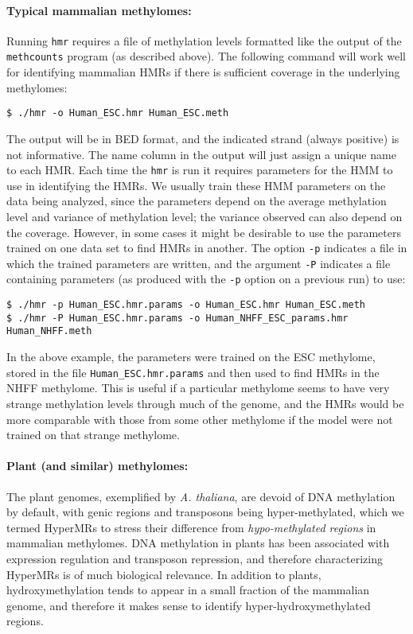 \documentclass[10pt]{article}
\newcommand{\prog}[1]{\texttt{#1}}
\newcommand{\fn}[1]{\texttt{#1}}
\newcommand{\op}[1]{\texttt{#1}}
\begin{document}
\paragraph{Typical mammalian methylomes:}
Running \prog{hmr} requires a file of methylation levels formatted
like the output of the \prog{methcounts} program (as described
above). The following command will work well for identifying mammalian
HMRs if there is sufficient coverage in the underlying methylomes:
\begin{verbatim}
$ ./hmr -o Human_ESC.hmr Human_ESC.meth
\end{verbatim}
The output will be in BED format, and the indicated strand (always
positive) is not informative. The name column in the output will just
assign a unique name to each HMR. Each time the \prog{hmr} is run it
requires parameters for the HMM to use in identifying the HMRs. We
usually train these HMM parameters on the data being analyzed, since
the parameters depend on the average methylation level and variance of
methylation level; the variance observed can also depend on the
coverage. However, in some cases it might be desirable to use the
parameters trained on one data set to find HMRs in another. The option
\op{-p} indicates a file in which the trained parameters are written,
and the argument \op{-P} indicates a file containing parameters (as
produced with the \op{-p} option on a previous run) to use:
\begin{verbatim}
$ ./hmr -p Human_ESC.hmr.params -o Human_ESC.hmr Human_ESC.meth
$ ./hmr -P Human_ESC.hmr.params -o Human_NHFF_ESC_params.hmr Human_NHFF.meth
\end{verbatim}
In the above example, the parameters were trained on the ESC
methylome, stored in the file \fn{Human\_ESC.hmr.params} and then
used to find HMRs in the NHFF methylome.
This is useful if a particular methylome
seems to have very strange methylation levels through much of the
genome, and the HMRs would be more comparable with those from some
other methylome if the model were not trained on that strange
methylome.



\paragraph{Plant (and similar) methylomes:} 
The plant genomes, exemplified by \textit{A. thaliana}, are devoid of
DNA methylation by default, with genic regions and transposons being
hyper-methylated, which we termed HyperMRs to stress their difference
from \textit{hypo-methylated regions} in mammalian methylomes. DNA
methylation in plants has been associated with expression regulation
and transposon repression, and therefore characterizing HyperMRs is of
much biological relevance. In addition to plants, hydroxymethylation
tends to appear in a small fraction of the mammalian genome, and therefore
it makes sense to identify hyper-hydroxymethylated regions.
\end{document}

